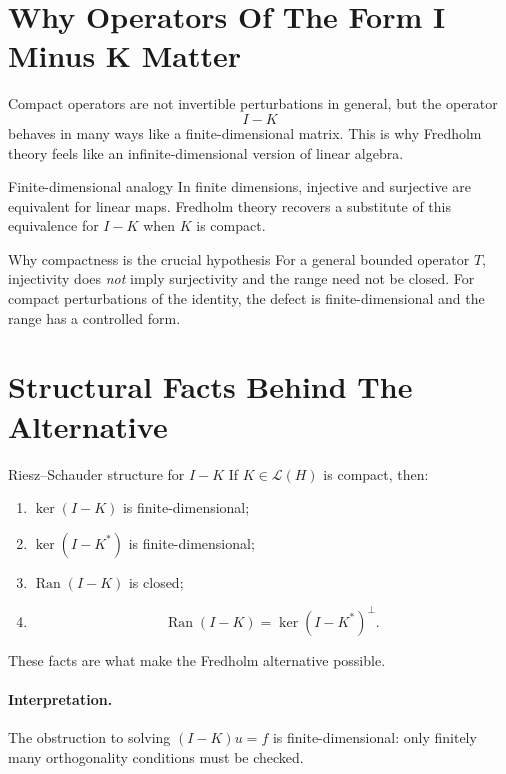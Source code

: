 \documentclass[11pt]{article}
\begin{document}
\section{Why Operators Of The Form I Minus K Matter}

\begin{focusbox}
Compact operators are not invertible perturbations in general, but the operator
\[
I-K
\]
behaves in many ways like a finite-dimensional matrix. This is why Fredholm theory feels like an infinite-dimensional version of linear algebra.
\end{focusbox}

\begin{warningbox}{Finite-dimensional analogy}
In finite dimensions, injective and surjective are equivalent for linear maps. Fredholm theory recovers a substitute of this equivalence for $I-K$ when $K$ is compact.
\end{warningbox}

\begin{exbox}{Why compactness is the crucial hypothesis}
For a general bounded operator $T$, injectivity does \emph{not} imply surjectivity and the range need not be closed. For compact perturbations of the identity, the defect is finite-dimensional and the range has a controlled form.
\end{exbox}

\section{Structural Facts Behind The Alternative}

\begin{thmbox}{Riesz--Schauder structure for $I-K$}
If $K\in\mathcal L(H)$ is compact, then:
\begin{enumerate}
\item $\ker(I-K)$ is finite-dimensional;
\item $\ker(I-K^*)$ is finite-dimensional;
\item $\operatorname{Ran}(I-K)$ is closed;
\item
\[
\operatorname{Ran}(I-K)=\ker(I-K^*)^{\perp}.
\]
\end{enumerate}
These facts are what make the Fredholm alternative possible.
\end{thmbox}

\paragraph{Interpretation.}
The obstruction to solving $(I-K)u=f$ is finite-dimensional: only finitely many orthogonality conditions must be checked.
\end{document}
